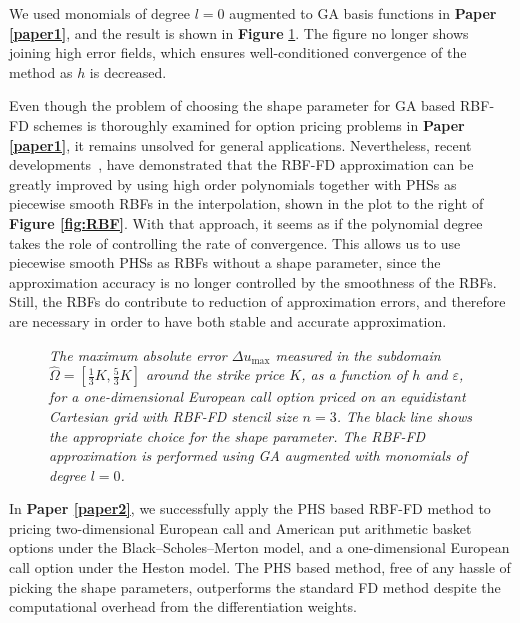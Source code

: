 \documentclass{UUThesisTemplate}
\begin{document}
\par
We used monomials of degree $l=0$ augmented to GA basis functions in \textbf{Paper \ref{paper1}}, and the result is shown in \textbf{Figure} \ref{fig:contour2}. The figure no longer shows joining high error fields, which ensures well-conditioned convergence of the method as $h$ is decreased.
\par
Even though the problem of choosing the shape parameter for GA based RBF-FD schemes is thoroughly examined for option pricing problems in \textbf{Paper \ref{paper1}}, it remains unsolved for general applications. Nevertheless, recent developments~\cite{flyer2016on, bayona2017role}, have demonstrated that the RBF-FD approximation can be greatly improved by using high order polynomials together with PHSs as piecewise smooth RBFs in the interpolation, shown in the plot to the right of \textbf{Figure \ref{fig:RBF}}. With that approach, it seems as if the polynomial degree takes the role of controlling the rate of convergence. This allows us to use piecewise smooth PHSs as RBFs without a shape parameter, since the approximation accuracy is no longer controlled by the smoothness of the RBFs. Still, the RBFs do contribute to reduction of approximation errors, and therefore are necessary in order to have both stable and accurate approximation.
\begin{figure}[H]
\centering


\caption{\emph{The maximum absolute error $\Delta u_{\max}$ measured in the subdomain $\hat\Omega=[\frac{1}{3}K,\frac{5}{3}K]$ around the strike price $K$, as a function of $h$ and $\varepsilon$, for a one-dimensional European call option priced on an equidistant Cartesian grid with RBF-FD stencil size $n=3$. The black line shows the appropriate choice for the shape parameter. The RBF-FD approximation is performed using GA augmented with monomials of degree $l=0$.}}
\label{fig:contour2}
\end{figure}

\par
In \textbf{Paper \ref{paper2}}, we successfully apply the PHS based RBF-FD method to pricing two-dimensional European call and American put arithmetic basket options under the Black--Scholes--Merton model, and a one-dimensional European call option under the Heston model. The PHS based method, free of any hassle of picking the shape parameters, outperforms the standard FD method despite the computational overhead from the differentiation weights.
%
\end{document}
